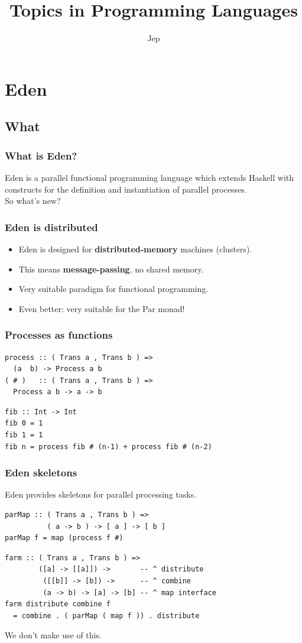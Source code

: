 \documentclass[12pt, danish]{beamer}
\title{Topics in Programming Languages}
\author{Jep}
\begin{document}
\begin{frame}
\titlepage
\end{frame}

\section{Eden}

\subsection{What}

\begin{frame}
\frametitle{What is Eden?}

Eden is a parallel functional programming language which extends
Haskell with constructs for the definition and instantiation of
parallel processes.\\
\pause
So what's new?
\end{frame}

\begin{frame}
\frametitle{Eden is distributed}

\begin{itemize}
\item Eden is designed for \textbf{distributed-memory} machines
  (clusters).\pause
\item This means \textbf{message-passing}, no shared memory.\pause
\item Very suitable paradigm for functional programming.\pause
\item Even better: very suitable for the Par monad!
\end{itemize}
\end{frame}

\begin{frame}[fragile]
\frametitle{Processes as functions}

\begin{verbatim}
process :: ( Trans a , Trans b ) =>
  (a  b) -> Process a b
( # )   :: ( Trans a , Trans b ) =>
  Process a b -> a -> b
\end{verbatim}
\pause
\begin{verbatim}
fib :: Int -> Int
fib 0 = 1
fib 1 = 1
fib n = process fib # (n-1) + process fib # (n-2)
\end{verbatim}
\end{frame}

\begin{frame}[fragile]
\frametitle{Eden skeletons}

Eden provides skeletons for parallel processing tasks.

\begin{verbatim}
parMap :: ( Trans a , Trans b ) =>
          ( a -> b ) -> [ a ] -> [ b ]
parMap f = map (process f #)
\end{verbatim}
\pause
\begin{verbatim}
farm :: ( Trans a , Trans b ) =>
        ([a] -> [[a]]) ->       -- ^ distribute
         ([[b]] -> [b]) ->      -- ^ combine
         (a -> b) -> [a] -> [b] -- ^ map interface
farm distribute combine f
  = combine . ( parMap ( map f )) . distribute
\end{verbatim}
\pause
We don't make use of this.
\end{frame}
\end{document}
